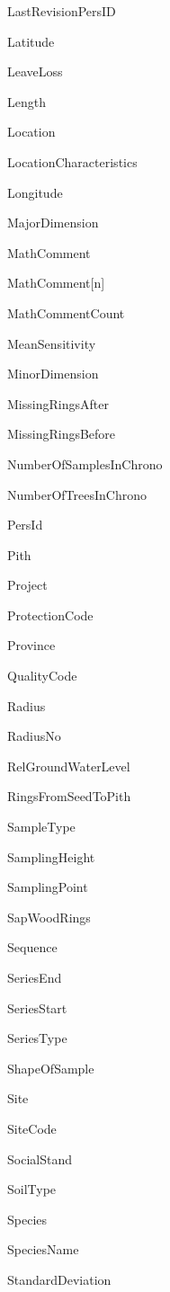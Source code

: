 \documentclass[10pt, headsepline,DIV14,BCOR0.5cm]{scrreprt}
\begin{document}
\begin{multicols}{2}
\begin{itemize*}
 \item  LastRevisionPersID
 \item  Latitude
 \item  LeaveLoss
 \item  Length
 \item  Location
 \item  LocationCharacteristics
 \item  Longitude
 \item  MajorDimension
 \item  MathComment
 \item  MathComment[n]
 \item  MathCommentCount
 \item  MeanSensitivity
 \item  MinorDimension
 \item  MissingRingsAfter
 \item  MissingRingsBefore
 \item  NumberOfSamplesInChrono
 \item  NumberOfTreesInChrono
 \item  PersId
 \item  Pith
 \item  Project
 \item  ProtectionCode
 \item  Province
 \item  QualityCode
 \item  Radius
 \item  RadiusNo
 \item  RelGroundWaterLevel
 \item  RingsFromSeedToPith
 \item  SampleType
 \item  SamplingHeight
 \item  SamplingPoint
 \item  SapWoodRings
 \item  Sequence
 \item  SeriesEnd
 \item  SeriesStart
 \item  SeriesType
 \item  ShapeOfSample
 \item  Site
 \item  SiteCode
 \item  SocialStand
 \item  SoilType
 \item  Species
 \item  SpeciesName
 \item  StandardDeviation

\end{itemize*}
\end{multicols}
\end{document}
